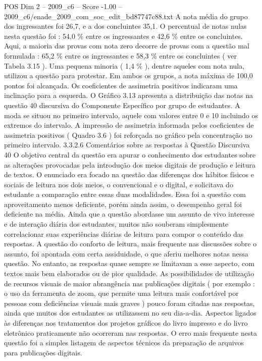 \begin{textsample}{POS Dim 2 – 2009\_c6 – Score -1.00 – 2009\_c6/enade\_2009\_com\_soc\_edit\_bd87747c88.txt}
A nota média do grupo dos ingressantes foi 26,7, e a dos concluintes 35,1.
O percentual de notas nulas nesta questão foi : 54,0 \% entre os ingressantes e 42,6 \% entre os concluintes.
Aqui, a maioria das provas com nota zero decorre de provas com a questão mal formulada : 65,2 \% entre os ingressantes e 58,3 \% entre os concluintes ( ver Tabela 3.15 ).
Uma pequena minoria ( 1,4 \% ), dentre aqueles com nota nula, utilizou a questão para protestar.
Em ambos os grupos, a nota máxima de 100,0 pontos foi alcançada.
Os coeficientes de assimetria positivos indicaram uma inclinação para a esquerda.
O Gráfico 3.13 apresenta a distribuição das notas na questão 40 discursiva do Componente Específico por grupo de estudantes.
A moda se situou no primeiro intervalo, aquele com valores entre 0 e 10 incluindo os extremos do intervalo.
A impressão de assimetria informada pelos coeficientes de assimetria positivos ( Quadro 3.6 ) foi reforçada no gráfico pela concentração no primeiro intervalo. 3.3.2.6 Comentários sobre as respostas à Questão Discursiva 40 O objetivo central da questão era apurar o conhecimento dos estudantes sobre as alterações provocadas pela introdução dos meios digitais de produção e leitura de textos.
O enunciado era focado na questão das diferenças dos hábitos físicos e sociais de leitura nos dois meios, o convencional e o digital, e solicitava do estudante a comparação entre essas duas modalidades.
Essa foi a questão com aproveitamento menos deficiente, porém ainda assim, o desempenho geral foi deficiente na média.
Ainda que a questão abordasse um assunto de vivo interesse e de interação diária dos estudantes, muitos não souberam simplesmente correlacionar suas experiências diárias de leitura para compor o conteúdo das respostas.
A questão do conforto de leitura, mais frequente nas discussões sobre o assunto, foi apontada com certa assiduidade, o que aferiu melhores notas nessa questão.
No entanto, as respostas quase sempre se limitavam a esse aspecto, com textos mais bem elaborados ou de pior qualidade.
As possibilidades de utilização de recursos visuais de maior abrangência nas publicações digitais ( por exemplo : o uso da ferramenta de zoom, que permite uma leitura mais confortável por pessoas com deficiências visuais mais graves ) pouco foram citadas nas respostas, ainda que muitos dos estudantes as utilizassem no seu dia-a-dia.
Aspectos ligados às diferenças nos tratamentos dos projetos gráficos do livro impresso e do livro eletrônico praticamente não ocorreram nas respostas.
O erro mais frequente nesta questão foi a simples listagem de aspectos técnicos da preparação de arquivos para publicações digitais.

\end{textsample}
